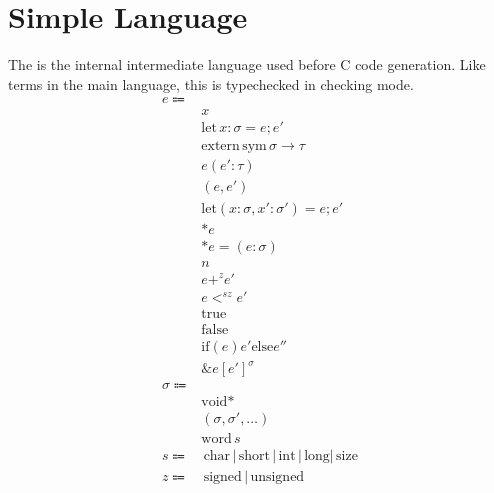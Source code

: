 \documentclass {article}
\begin{document}
\section{Simple Language}
The is the internal intermediate language used before C code generation.
Like terms in the main language, this is typechecked in checking mode.
\begin{align*}
e \Coloneqq & \\
& x \\
& \text{let} \, x : \sigma = e; e' \\
& \text{extern} \, \text{sym} \, \sigma \to \tau \\
& e(e' : \tau) \\
& (e,e') \\
& \text{let} (x: \sigma, x' : \sigma') = e; e' \\
& * e \\
& * e = (e : \sigma) \\
& n \\
& e +^z e' \\
& e <^{sz} e' \\
& \text{true} \\
& \text{false} \\
& \text{if} (e) {e'} \text{else} {e''} \\
& \&e[e']^\sigma \\
\sigma \Coloneqq & \\
& \text{void}* \\ 
& (\sigma, \sigma', \dots) \\
& \text{word} \, s \\
s \Coloneqq & \, \text{char} \, | \, \text{short} \, | \, \text{int} \, | \, \text{long} | \, \text{size} \\
z \Coloneqq & \, \text{signed} \, | \, \text{unsigned}
\end{align*}
\end{document}
